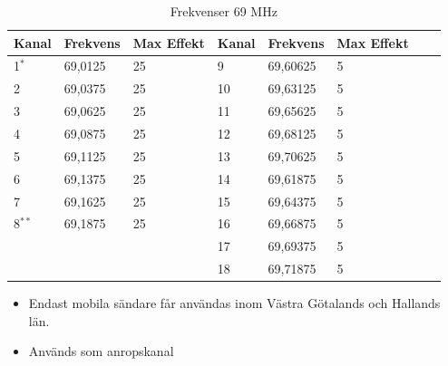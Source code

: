 \begin{table}[H]
\centering
\begin{tabular}{lll|lllll}

\textbf{Kanal} & \textbf{Frekvens} & \textbf{Max Effekt} & 
	\textbf{Kanal} & \textbf{Frekvens} & \textbf{Max Effekt}      \\ \hline

1$^*$     & 69,0125  & 25     &  9     & 69,60625 & 5          &          \\
2     & 69,0375  & 25         &  10    & 69,63125 & 5          &          \\
3     & 69,0625  & 25         &  11    & 69,65625 & 5          &          \\
4    & 69,0875  & 25         &   12    & 69,68125 & 5          &          \\
5     & 69,1125  & 25         & 13    & 69,70625 & 5          &          \\
6     & 69,1375  & 25         &  14    & 69,61875 & 5          &          \\
7     & 69,1625  & 25         &  15    & 69,64375 & 5          &          \\
8$^{**}$     & 69,1875  & 25  & 16    & 69,66875 & 5          &          \\
      &          &            &   17    & 69,69375 & 5          &          \\
      &          &            &   18    & 69,71875 & 5          &         
\end{tabular}
\caption{Frekvenser 69 MHz}
\end{table}
\footnotesize
\begin{itemize}
	\item[$^*$] Endast mobila sändare får användas inom Västra Götalands och Hallands län.
	\item[$^{**}$] Används som anropskanal
\end{itemize}
\normalsize